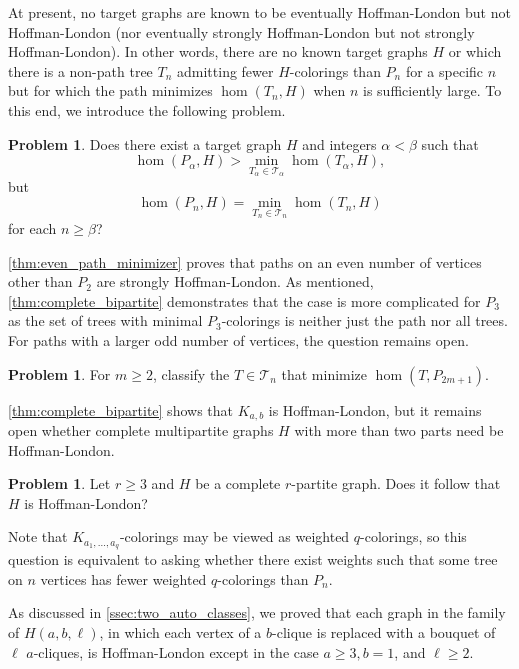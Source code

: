 \documentclass[11pt]{article}
\theoremstyle{definition}
\newtheorem{problem}[theorem]{Problem}
\begin{document}
At present, no target graphs are known to be eventually Hoffman-London but not Hoffman-London (nor eventually strongly Hoffman-London but not strongly Hoffman-London). In other words, there are no known target graphs $H$ or which there is a non-path tree $T_n$ admitting fewer $H$-colorings than $P_n$ for a specific $n$ but for which the path minimizes $\hom(T_n,H)$ when $n$ is sufficiently large. To this end, we introduce the following problem.

\begin{problem}
    Does there exist a target graph $H$ and integers $\alpha < \beta$ such that
    \[ \hom(P_{\alpha},H) > \min_{T_{\alpha} \in \mathcal{T}_{\alpha}} \hom(T_{\alpha},H), \]
    but
    \[ \hom(P_{n},H) = \min_{T_n \in \mathcal{T}_n} \hom(T_n,H) \]
    for each $n \ge \beta$?
\end{problem}

\cref{thm:even_path_minimizer} proves that paths on an even number of vertices other than $P_2$ are strongly Hoffman-London. As mentioned, \cref{thm:complete_bipartite} demonstrates that the case is more complicated for $P_3$ as the set of trees with minimal $P_3$-colorings is neither just the path nor all trees. For paths with a larger odd number of vertices, the question remains open. 

\begin{problem}
    For $m \ge 2$, classify the $T \in \mathcal{T}_n$ that minimize $\hom(T,P_{2m+1})$.
\end{problem}

\cref{thm:complete_bipartite} shows that $K_{a,b}$ is Hoffman-London, but it remains open whether complete multipartite graphs $H$ with more than two parts need be Hoffman-London. 

\begin{problem}
    Let $r \ge 3$ and $H$ be a complete $r$-partite graph. Does it follow that $H$ is Hoffman-London?
\end{problem}

Note that $K_{a_1, \ldots, a_q}$-colorings may be viewed as weighted $q$-colorings, so this question is equivalent to asking whether there exist weights such that some tree on $n$ vertices has fewer weighted $q$-colorings than $P_n$.

As discussed in \cref{ssec:two_auto_classes}, we proved that each graph in the family of $H(a,b,\ell)$, in which each vertex of a $b$-clique is replaced with a bouquet of $\ell$ $a$-cliques, is Hoffman-London except in the case $a \ge 3, b = 1$, and $\ell \ge 2$.
\end{document}
